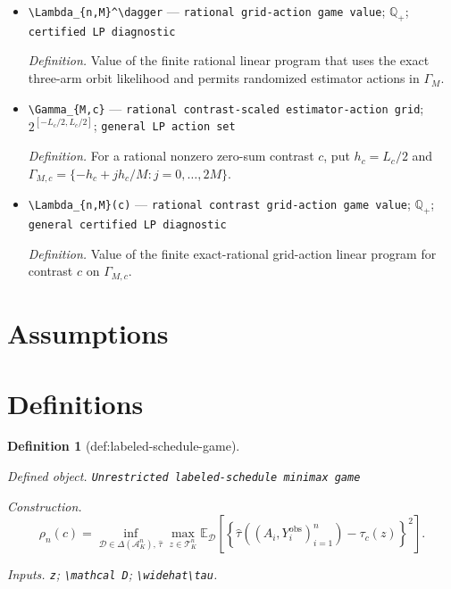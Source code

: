 \documentclass{article}
\newtheorem{definition}{Definition}
\begin{document}
\begin{itemize}
  \item \texttt{\textbackslash{}\allowbreak{}Lambda\_\allowbreak{}\{n,\allowbreak{}M\}\allowbreak{}\textasciicircum{}\textbackslash{}\allowbreak{}dagger} --- \texttt{rational grid-\allowbreak{}action game value}; \(\mathbb Q_+\); \texttt{certified LP diagnostic}
  \par\smallskip\noindent\emph{Definition.} Value of the finite rational linear program that uses the exact three-arm orbit likelihood and permits randomized estimator actions in \(\Gamma_M\).
  \item \texttt{\textbackslash{}\allowbreak{}Gamma\_\allowbreak{}\{M,\allowbreak{}c\}\allowbreak{}} --- \texttt{rational contrast-\allowbreak{}scaled estimator-\allowbreak{}action grid}; \(2^{[-L_c/2,L_c/2]}\); \texttt{general LP action set}
  \par\smallskip\noindent\emph{Definition.} For a rational nonzero zero-sum contrast \(c\), put \(h_c=L_c/2\) and \(\Gamma_{M,c}=\{-h_c+jh_c/M:j=0,\ldots,2M\}\).
  \item \texttt{\textbackslash{}\allowbreak{}Lambda\_\allowbreak{}\{n,\allowbreak{}M\}\allowbreak{}(c)} --- \texttt{rational contrast grid-\allowbreak{}action game value}; \(\mathbb Q_+\); \texttt{general certified LP diagnostic}
  \par\smallskip\noindent\emph{Definition.} Value of the finite exact-rational grid-action linear program for contrast \(c\) on \(\Gamma_{M,c}\).
\end{itemize}

\section{Assumptions}

\section{Definitions}

\begin{definition}[def:labeled-schedule-game]\label{def:labeled-schedule-game}
\par\smallskip\noindent\emph{Defined object.} \texttt{Unrestricted labeled-\allowbreak{}schedule minimax game}
\par\smallskip\noindent\emph{Construction.} \[\rho_n(c)=\inf_{\mathcal D\in\Delta(\mathcal A_K^n),\,\widehat\tau}\max_{z\in\mathcal T_K^n}\mathbb E_{\mathcal D}\left[\left\{\widehat\tau((A_i,Y_i^{\mathrm{obs}})_{i=1}^n)-\tau_c(z)\right\}^2\right].\]
\par\smallskip\noindent\emph{Inputs.} \texttt{z}; \texttt{\textbackslash{}\allowbreak{}mathcal D}; \texttt{\textbackslash{}\allowbreak{}widehat\textbackslash{}\allowbreak{}tau}.
\end{definition}
\end{document}
